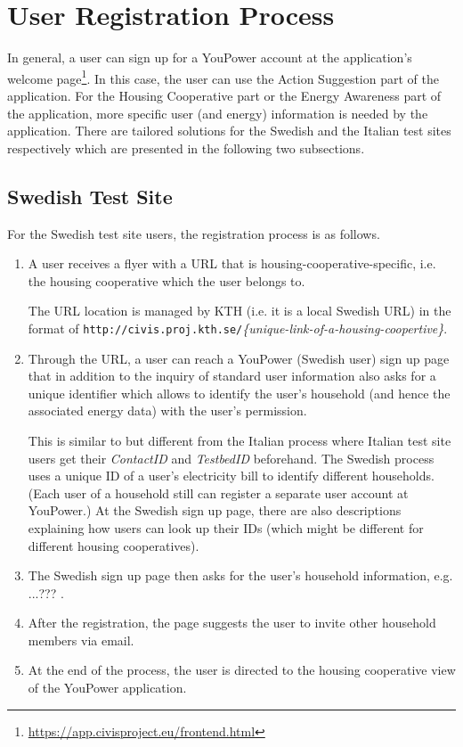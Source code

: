 \section{User Registration Process}

In general, a user can sign up for a YouPower account at the application's welcome page\footnote{\url{https://app.civisproject.eu/frontend.html}}. In this case, the user can use the Action Suggestion part of the application. For the Housing Cooperative part or the Energy Awareness part of the application, more specific user (and energy) information is needed by the application. There are tailored solutions for the Swedish and the Italian test sites respectively which are presented in the following two subsections. 

\subsection{Swedish Test Site}

For the Swedish test site users, the registration process is as follows. 

\begin{enumerate}
\item A user receives a flyer with a URL that is housing-cooperative-specific, i.e. the housing cooperative which the user belongs to. 

The URL location is managed by KTH (i.e. it is a local Swedish URL) in the format of  \texttt{\small http://civis.proj.kth.se/}\textit{\{unique-link-of-a-housing-coopertive\}}. 

\item Through the URL, a user can reach a YouPower (Swedish user) sign up page that in addition to the inquiry of standard user information also asks for a unique identifier which allows to identify the user's household (and hence the associated energy data) with the user's permission. 

This is similar to but different from the Italian process where Italian test site users get their \textit{ContactID} and \textit{TestbedID} beforehand. The Swedish process uses a unique ID of a user's electricity bill to identify different households. (Each user of a household still can register a separate user account at YouPower.) At the Swedish sign up page, there are also descriptions explaining how users can look up their IDs (which might be different for different housing cooperatives). 

\item The Swedish sign up page then asks for the user's household information, e.g. ...??? . 

\item After the registration, the page suggests the user to invite other household members via email.

\item At the end of the process, the user is directed to the housing cooperative view of the YouPower application. 

\end{enumerate}

